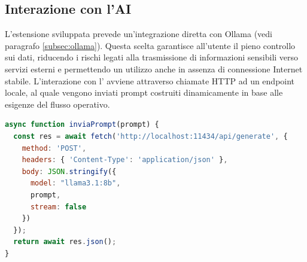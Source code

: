 \subsection{Interazione con l'AI}
\noindent L’estensione sviluppata prevede un’integrazione diretta con Ollama (vedi paragrafo \ref{subsec:ollama}). Questa scelta garantisce all’utente il pieno controllo sui dati, riducendo i rischi legati alla trasmissione di informazioni sensibili verso servizi esterni e permettendo un utilizzo anche in assenza di connessione Internet stabile. L’interazione con l’ avviene attraverso chiamate HTTP ad un endpoint locale, al quale vengono inviati prompt costruiti dinamicamente in base alle esigenze del flusso operativo.

\begin{lstlisting}[language=JavaScript, caption={Funzione di interazione con Ollama}]
async function inviaPrompt(prompt) {
  const res = await fetch('http://localhost:11434/api/generate', {
    method: 'POST',
    headers: { 'Content-Type': 'application/json' },
    body: JSON.stringify({
      model: "llama3.1:8b",
      prompt,
      stream: false
    })
  });
  return await res.json();
}
\end{lstlisting}

